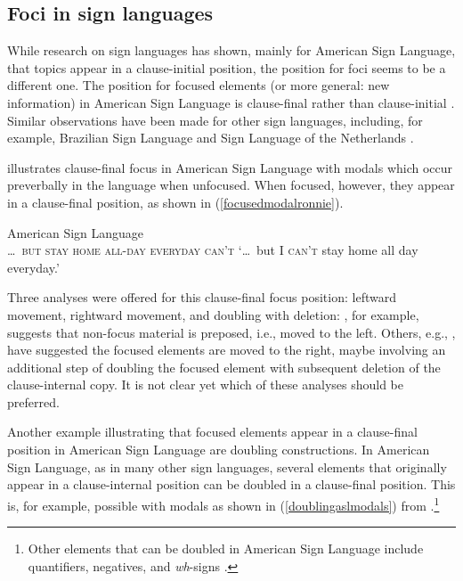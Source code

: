 \subsection{Foci in sign languages}
While research on sign languages has shown, mainly for American Sign Language, that topics appear in a clause-initial position, the position for foci seems to be a different one. The position for focused elements (or more general: new information) in American Sign Language is clause-final rather than clause-initial \citep{wilbur1991intonation, wilbur1994foregrounding, wilbur1996evidence, wilbur1997prosodic}. Similar observations have been made for other sign languages, including, for example, Brazilian Sign Language \citep{de1999phrase} and Sign Language of the Netherlands \citep{crasbornkoijiros2012}. 

\citet[92]{wilbur1997prosodic} illustrates clause-final focus in American Sign Language with modals which occur preverbally in the language when unfocused. When focused, however, they appear in a clause-final position, as shown in (\ref{focusedmodalronnie}).

\begin{exe}
\ex American Sign Language \citep[92]{wilbur1997prosodic} \\ %
{\textsc{\dots\ but stay home all-day everyday can't}}
\glt `\dots\ but I \textsc{can't} stay home all day everyday.' \label{focusedmodalronnie}
\end{exe}

\noindent Three analyses were offered for this clause-final focus position: leftward movement, rightward movement, and  doubling with deletion: \citet{wilbur1997prosodic}, for example, suggests that non-focus material is preposed, i.e., moved to the left. Others, e.g., \citet{petronio1993clause}, have suggested the focused elements are moved to the right, maybe involving an additional step of doubling the focused element with subsequent deletion of the clause-internal copy. It is not clear yet which of these analyses should be preferred.  

Another example illustrating that focused elements appear in a clause-final position in American Sign Language are doubling constructions. In American Sign Language, as in many other sign languages, several elements that originally appear in a clause-internal position can be doubled in a clause-final position. This is, for example, possible with modals as shown in (\ref{doublingaslmodals}) from \citet[135]{petronio1993clause}.\footnote{ Other elements that can be doubled in American Sign Language include quantifiers, negatives, and \textit{wh}-signs \citep{petronio1993clause}.}

